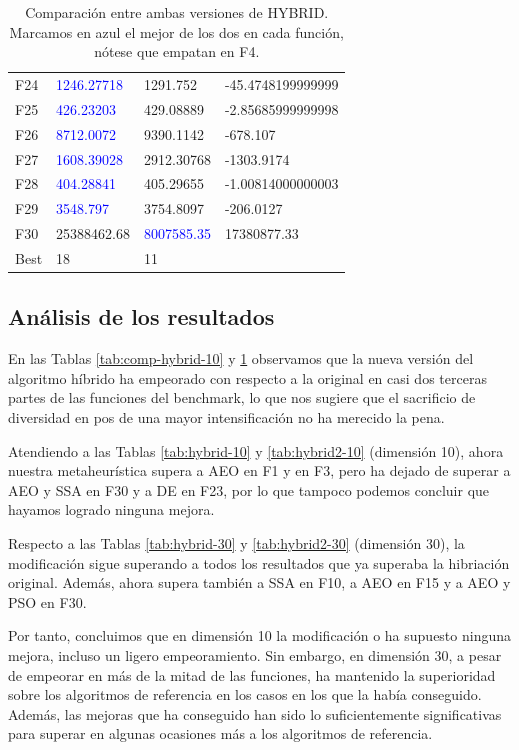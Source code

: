 \documentclass{article}
\begin{document}
\begin{table}[H]
\begin{tabular}{|l|ll|l|}
F24  &		\textcolor{blue}{1246.27718} & 1291.752 & -45.4748199999999\\
F25  &		\textcolor{blue}{426.23203} & 429.08889 & -2.85685999999998\\
F26  &		\textcolor{blue}{8712.0072} & 9390.1142 & -678.107\\
F27  &		\textcolor{blue}{1608.39028} & 2912.30768 & -1303.9174\\
F28  &		\textcolor{blue}{404.28841} & 405.29655 & -1.00814000000003\\
F29  &		\textcolor{blue}{3548.797} & 3754.8097 & -206.0127\\
F30  &		25388462.68 & \textcolor{blue}{8007585.35} & 17380877.33\\ \hline
Best & 18	& 11 & {} \\	\hline
	\end{tabular}
\caption{Comparación entre ambas versiones de HYBRID. Marcamos en azul el mejor de los dos en cada función, nótese que
	empatan en F4.}
	\label{tab:comp-hybrid-30}
\end{table}

\subsection{Análisis de los resultados}

En las Tablas \ref{tab:comp-hybrid-10} y \ref{tab:comp-hybrid-30} observamos que la nueva versión del algoritmo híbrido ha empeorado
con respecto a la original en casi dos terceras partes de las funciones del benchmark, lo que nos sugiere que el sacrificio de
diversidad en pos de una mayor intensificación no ha merecido la pena.

Atendiendo a las Tablas \ref{tab:hybrid-10} y \ref{tab:hybrid2-10} (dimensión 10), ahora nuestra metaheurística supera a AEO en F1 y en F3, pero
ha dejado de superar a AEO y SSA en F30 y a DE en F23, por lo que tampoco podemos concluir que hayamos logrado ninguna mejora.

Respecto a las Tablas \ref{tab:hybrid-30} y \ref{tab:hybrid2-30} (dimensión 30), la modificación sigue superando a todos los
resultados que ya superaba la hibriación original. Además, ahora supera también a SSA en F10, a AEO en F15 y a AEO y PSO en F30.

Por tanto, concluimos que en dimensión 10 la modificación o ha supuesto ninguna mejora, incluso un ligero empeoramiento. Sin embargo,
en dimensión 30, a pesar de empeorar en más de la mitad de las funciones, ha mantenido la superioridad sobre los algoritmos de
referencia en los casos en los que la había conseguido. Además, las mejoras que ha conseguido han sido lo suficientemente
significativas para superar en algunas ocasiones más a los algoritmos de referencia.
\end{document}
